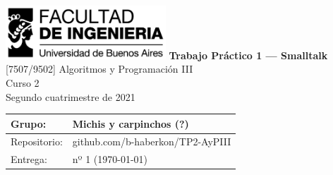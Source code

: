 \documentclass[titlepage,a4paper]{article}
\def \nombreGrupo {Michis y carpinchos (?)}
\begin{document}
\begin{titlepage} %
	\hfill\includegraphics[width=6cm]{img/logofiuba.jpg}
    \centering
    \vfill
    \Huge \textbf{Trabajo Práctico 1 — Smalltalk}
    \vskip2cm
    \Large [7507/9502] Algoritmos y Programación III\\
    Curso 2 \\ %
    Segundo cuatrimestre de 2021
    \vfill
    \begin{tabular}{ | l | l | } %
      \hline
      Grupo: & \nombreGrupo \\ \hline
      Repositorio: & github.com/b-haberkon/TP2-AyPIII \\ \hline
      Entrega: & nº 1 (\today) \\ \hline
  	\end{tabular}
    \vfill
    
    \vfill
\end{titlepage}

\tableofcontents %
\newpage



\filbreak %


\newpage


\newpage


\newpage


\newpage


\newpage

\end{document}
